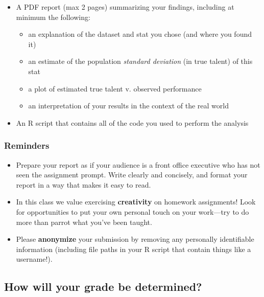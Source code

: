 \documentclass{article}
\begin{document}
        \begin{itemize}
          \item A PDF report (max 2 pages) summarizing your findings, including at minimum the following:
          \begin{itemize}
            \item an explanation of the dataset and stat you chose (and where you found it)
            \item an estimate of the population {\it standard deviation} (in true talent) of this stat
            \item a plot of estimated true talent v. observed performance
            \item an interpretation of your results in the context of the real world
          \end{itemize}
          \item An R script that contains all of the code you used to perform the analysis
        \end{itemize}

      \subsubsection*{\sc Reminders}

        \begin{itemize}
          \item Prepare your report as if your audience is a front office executive who has not seen the assignment prompt. Write clearly and concisely, and format your report in a way that makes it easy to read.
          \item In this class we value exercising {\bf creativity} on homework assignments! Look for opportunities to put your own personal touch on your work---try to do more than parrot what you've been taught.
          \item Please {\bf anonymize} your submission by removing any personally identifiable information (including file paths in your R script that contain things like a username!).
        \end{itemize}

    \subsection*{\sc How will your grade be determined?}
\end{document}

